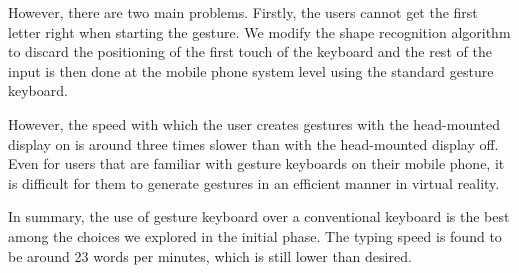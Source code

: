 However, there are two main problems.  
Firstly, the users cannot get the first letter right when starting the gesture.  We modify the shape recognition algorithm to discard the positioning of the first touch of the keyboard and the rest of the input is then done at the mobile phone system level using the standard gesture keyboard.

However, the speed with which the user creates gestures with the head-mounted display on is around three times slower than with the head-mounted display off.
Even for users that are familiar with gesture keyboards on their mobile phone, it is difficult for them to generate gestures in an efficient manner in virtual reality.

In summary, the use of gesture keyboard over a conventional keyboard is the best among the choices we explored in the initial phase.  The typing speed is found to be 
around 23 words per minutes, which is still lower than desired.


